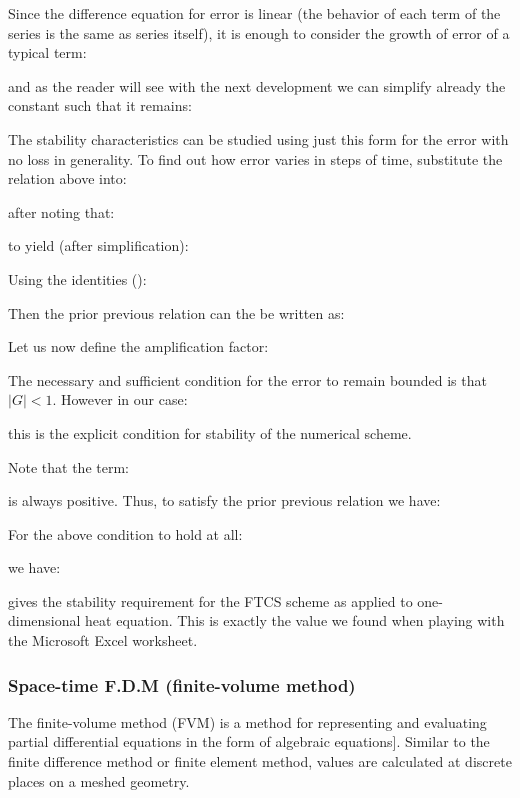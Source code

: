 	Since the difference equation for error is linear (the behavior of each term of the series is the same as series itself), it is enough to consider the growth of error of a typical term:
	
	and as the reader will see with the next development we can simplify already the constant such that it remains:
	
	The stability characteristics can be studied using just this form for the error with no loss in generality. To find out how error varies in steps of time, substitute the relation above into:
	
	after noting that:
	
	to yield (after simplification):
	
	Using the identities ():
	
	Then the prior previous relation can the be written as:
	
	Let us now define the amplification factor:
	
	The necessary and sufficient condition for the error to remain bounded is that $|G|<1$. However in our case:
	
	this is the explicit condition for stability of the numerical scheme.
	
	Note that the term:
	
	is always positive. Thus, to satisfy the prior previous relation we have:
	
	For the above condition to hold at all:
	
	we have:
	
	gives the stability requirement for the FTCS scheme as applied to one-dimensional heat equation. This is exactly the value we found when playing with the Microsoft Excel worksheet.
	
	\subsubsection{Space-time F.D.M (finite-volume method)}
	The finite-volume method (FVM) is a method for representing and evaluating partial differential equations in the form of algebraic equations]. Similar to the finite difference method or finite element method, values are calculated at discrete places on a meshed geometry. 
	
